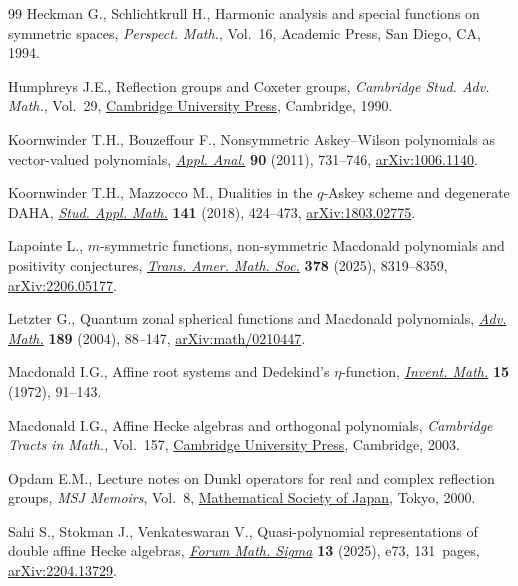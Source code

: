 \begin{thebibliography}{99}
Heckman G., Schlichtkrull H., Harmonic analysis and special functions on
 symmetric spaces, \textit{Perspect. Math.}, Vol.~16, Academic Press, San
 Diego, CA, 1994.

Humphreys J.E., Reflection groups and {C}oxeter groups, \textit{Cambridge Stud.
 Adv. Math.}, Vol.~29,
 \href{https://doi.org/10.1017/CBO9780511623646}{Cambridge University Press},
 Cambridge, 1990.

Koornwinder T.H., Bouzeffour F., Nonsymmetric {A}skey--{W}ilson polynomials as
 vector-valued polynomials,
 \href{https://doi.org/10.1080/00036811.2010.502117}{\textit{Appl. Anal.}}
 \textbf{90} (2011), 731--746,
 \href{http://arxiv.org/abs/1006.1140}{arXiv:1006.1140}.

Koornwinder T.H., Mazzocco M., Dualities in the {$q$}-{A}skey scheme and
 degenerate {DAHA}, \href{https://doi.org/10.1111/sapm.12229}{\textit{Stud.
 Appl. Math.}} \textbf{141} (2018), 424--473,
 \href{http://arxiv.org/abs/1803.02775}{arXiv:1803.02775}.

Lapointe L., {$m$}-symmetric functions, non-symmetric {M}acdonald polynomials
 and positivity conjectures,
 \href{https://doi.org/10.1090/tran/9351}{\textit{Trans. Amer. Math. Soc.}}
 \textbf{378} (2025), 8319--8359,
 \href{http://arxiv.org/abs/2206.05177}{arXiv:2206.05177}.

Letzter G., Quantum zonal spherical functions and {M}acdonald polynomials,
 \href{https://doi.org/10.1016/j.aim.2003.11.007}{\textit{Adv. Math.}}
 \textbf{189} (2004), 88--147,
 \href{http://arxiv.org/abs/math/0210447}{arXiv:math/0210447}.

Macdonald I.G., Affine root systems and {D}edekind's {$\eta $}-function,
 \href{https://doi.org/10.1007/BF01418931}{\textit{Invent. Math.}} \textbf{15}
 (1972), 91--143.

Macdonald I.G., Affine {H}ecke algebras and orthogonal polynomials,
 \textit{Cambridge Tracts in Math.}, Vol.~157,
 \href{https://doi.org/10.1017/CBO9780511542824}{Cambridge University Press},
 Cambridge, 2003.

Opdam E.M., Lecture notes on {D}unkl operators for real and complex reflection
 groups, \textit{MSJ Memoirs}, Vol.~8,
 \href{https://doi.org/10.2969/msjmemoirs/008010000}{Mathematical Society of
 Japan}, Tokyo, 2000.

Sahi S., Stokman J., Venkateswaran V., Quasi-polynomial representations of
 double affine {H}ecke algebras,
 \href{https://doi.org/10.1017/fms.2025.33}{\textit{Forum Math. Sigma}}
 \textbf{13} (2025), e73, 131~pages,
 \href{http://arxiv.org/abs/2204.13729}{arXiv:2204.13729}.


\end{thebibliography}
